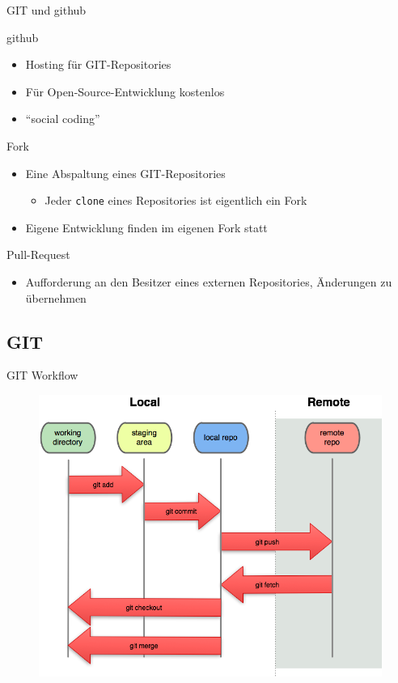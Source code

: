 \begin{frame}[fragile]{GIT und github}
	\begin{block}{github}
		\begin{itemize}
			\item Hosting für GIT-Repositories
			\item Für Open-Source-Entwicklung kostenlos
			\item \enquote{social coding}
		\end{itemize}
	\end{block}
	\begin{block}{Fork}
		\begin{itemize}
			\item Eine Abspaltung eines GIT-Repositories
			\begin{itemize}
				\item Jeder \verb|clone| eines Repositories ist eigentlich ein Fork
			\end{itemize}
			\item Eigene Entwicklung finden im eigenen Fork statt
		\end{itemize}
	\end{block}
	\begin{block}{Pull-Request}
		\begin{itemize}
			\item Aufforderung an den Besitzer eines externen Repositories, Änderungen zu übernehmen
		\end{itemize}
	\end{block}
\end{frame}

\subsection{GIT}
\begin{frame}{GIT Workflow}
	\begin{figure}
		\includegraphics[width=0.75\linewidth]{images/local-remote.png}
	\end{figure}
\end{frame}

